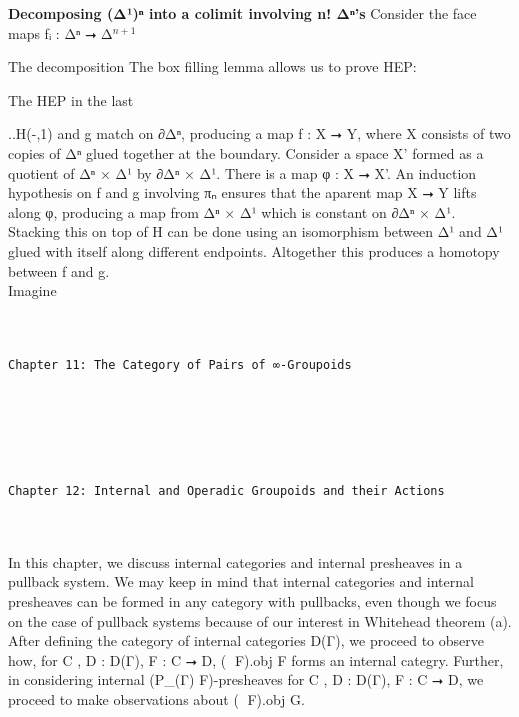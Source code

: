 \documentclass{book}
\theoremstyle{definition}
\renewcommand{\chapter}[1]{
\newpage
{
\Huge 
\begin{center}
\ \\
\ \\
\thispagestyle{empty}
\texttt{#1}
\end{center}}
\ \\
\ \\
}
\begin{document}
{\bf Decomposing (Δ¹)ⁿ into a colimit involving n! Δⁿ's} Consider the face maps fᵢ : Δⁿ ⭢ Δ${}^{n+1}$


The decomposition 
The box filling lemma allows us to prove HEP:


The HEP in the last 

..H(-,1) and g match on ∂Δⁿ, producing a map f : X ⭢ Y, where X consists of two copies of Δⁿ glued together at the boundary. Consider a space X' formed as a quotient of Δⁿ × Δ¹ by ∂Δⁿ × Δ¹. There is a map φ : X ⭢ X'. An induction hypothesis on f and g involving πₙ ensures that the aparent map X ⭢ Y lifts along φ, producing a map from Δⁿ × Δ¹ which is constant on ∂Δⁿ × Δ¹. Stacking this on top of H can be done using an isomorphism between Δ¹ and Δ¹ glued with itself along different endpoints. Altogether this produces a homotopy between f and g.\\

Imagine 


\chapter{Chapter 11: The Category of Pairs of ∞-Groupoids}




\chapter{Chapter 12: Internal and Operadic Groupoids and their Actions}

In this chapter, we discuss internal categories and internal presheaves in a pullback system. We may keep in mind that internal categories and internal presheaves can be formed in any category with pullbacks, even though we focus on the case of pullback systems because of our interest in Whitehead theorem (a).\\

After defining the category of internal categories D(Γ), we proceed to observe how, for C , D : D(Γ), F : C ⭢ D, (ω⃗ F).obj F forms an internal categry. Further, in considering internal (P⃗\_(Γ) F)-presheaves for  C , D : D(Γ), F : C ⭢ D, we proceed to make observations about (ω⃗ F).obj G.\\
\end{document}
